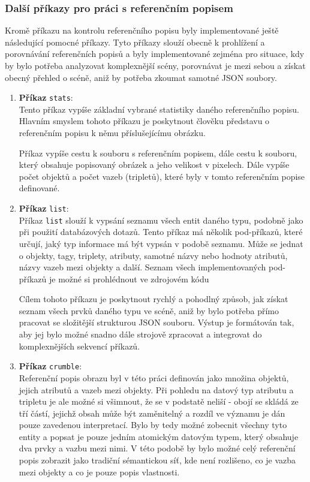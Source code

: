 \subsubsection{Další příkazy pro práci s referenčním popisem}
Kromě příkazu na kontrolu referenčního popisu byly implementované ještě následující pomocné příkazy.
Tyto příkazy slouží obecně k prohlížení a porovnávání referenčních popisů a byly implementované zejména pro situace, kdy by bylo potřeba analyzovat komplexnější scény, porovnávat je mezi sebou a získat obecný přehled o scéně, aniž by potřeba zkoumat samotné JSON soubory.
\begin{enumerate}
	\item \textbf{Příkaz} \texttt{stats}: \\
	      Tento příkaz vypíše základní vybrané statistiky daného referenčního popisu.
	      Hlavním smyslem tohoto příkazu je poskytnout člověku představu o referenčním popisu k němu příslušejícímu obrázku.

	      Příkaz vypíše cestu k souboru s referenčním popisem, dále cestu k souboru,
	      který obsahuje popisovaný obrázek a jeho velikost v pixelech.
	      Dále vypíše počet objektů a počet vazeb (tripletů), které byly v tomto referenčním popise definované.
	\item \textbf{Příkaz} \texttt{list}: \\
	      Příkaz \texttt{list} slouží k vypsání seznamu všech entit daného typu, podobně jako při použití databázových dotazů.
	      Tento příkaz má několik pod-příkazů, které určují, jaký typ informace má být vypsán v podobě seznamu.
	      Může se jednat o objekty, tagy, triplety, atributy, samotné názvy nebo hodnoty atributů,
	      názvy vazeb mezi objekty a další.
	      Seznam všech implementovaných pod-příkazů je možné si prohlédnout ve zdrojovém kódu

	      Cílem tohoto příkazu je poskytnout rychlý a pohodlný způsob, jak získat seznam všech prvků daného typu ve scéně, aniž by bylo potřeba přímo pracovat se složitější strukturou JSON souboru.
	      Výstup je formátován tak, aby jej bylo možné snadno dále strojově zpracovat a integrovat do komplexnějších sekvencí příkazů.
	\item \textbf{Příkaz} \texttt{crumble}: \\
	      Referenční popis obrazu byl v této práci definován jako množina objektů, jejich atributů a vazeb mezi objekty.
	      Při pohledu na datový typ atributu a tripletu je ale možné si všimnout, že se v podstatě neliší - obojí se skládá ze tří částí,
	      jejichž obsah může být zaměnitelný a rozdíl ve významu je dán pouze zavedenou interpretací.
	      Bylo by tedy možné zobecnit všechny tyto entity a popsat je pouze jedním atomickým datovým typem, který obsahuje dva prvky a vazbu mezi nimi.
	      V této podobě by bylo možné celý referenční popis zobrazit jako tradiční sémantickou síť, kde není rozlišeno, co je vazba mezi objekty a co je pouze popis vlastnosti.


\end{enumerate}
